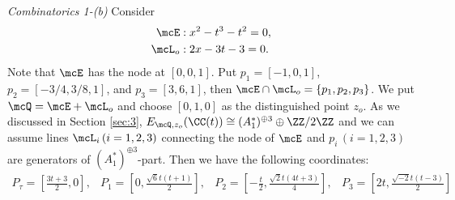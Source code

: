 \begin{exmple}[{\bf Combinatorics 1}]
{\sl Combinatorics 1-(b)} Consider 
\begin{align*}
\mcE &: x^{2} - t^{3} - {t}^{2} = 0, \\
{\mcL}_{o} &: 2x - 3t - 3 = 0.
\end{align*}
Note that $\mcE$ has the node at $[0, 0, 1]$. Put $p_{1}=[-1, 0, 1]$, $p_{2}=[-3/4, 3/8, 1]$, and $p_{3}=[3, 6, 1]$, then $\mcE \cap {\mcL}_{o} = \{ p_{1}, p_{2}, p_{3} \}$. We put $\mcQ = \mcE + {\mcL}_{o}$ and choose $[0, 1, 0]$ as the distinguished point $z_{o}$. As we discussed in Section \ref{sec:3}, $E_{\mcQ , z_{o}}(\CC (t)) \cong (A_{1}^{\ast})^{\oplus 3}\oplus \ZZ /2 \ZZ$ and we can assume lines $\mcL_{i} \, (i=1, 2, 3)$ connecting the node of $\mcE$ and $p_{i} \, (i=1, 2, 3)$ are generators of $(A_{1}^{\ast})^{\oplus 3}$-part. Then we have the following coordinates:
\[
\begin{array}{cccc}
P_{\tau} = \left[ \frac{3t+3}{2}, 0 \right],  & 
 P_{1} = \left[ 0, \frac{\sqrt{6}t(t+1)}{2} \right],  &
 P_{2} =\left[ - \frac{t}{2}, \frac{\sqrt{2}t(4t+3)}{4} \right],  &
 P_{3} = \left[ 2t, \frac{\sqrt{-2}t(t-3)}{2} \right] 
 \end{array}
 \]


\end{exmple}
